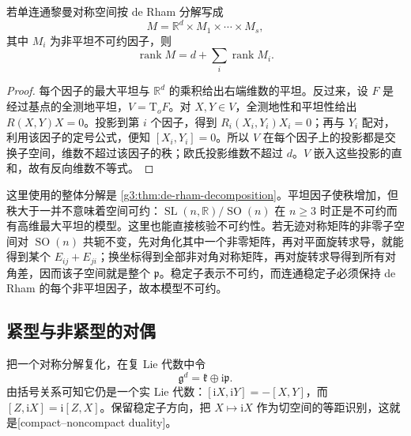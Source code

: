 \begin{proposition}\label{g3:prop:symmetric-rank-product}
	若单连通黎曼对称空间按 de Rham 分解写成
	\[
		M=\mathbb R^d\times M_1\times\cdots\times M_s,
	\]
	其中 \(M_i\) 为非平坦不可约因子，则
	\[
		\operatorname{rank}M=d+\sum_i\operatorname{rank}M_i.
	\]
\end{proposition}
\begin{proof}
	每个因子的最大平坦与 \(\mathbb R^d\) 的乘积给出右端维数的平坦。反过来，设 \(F\) 是经过基点的全测地平坦，\(V=\mathrm T_oF\)。对 \(X,Y\in V\)，全测地性和平坦性给出 \(R(X,Y)X=0\)。投影到第 \(i\) 个因子，得到 \(R_i(X_i,Y_i)X_i=0\)；再与 \(Y_i\) 配对，利用该因子的定号公式，便知 \([X_i,Y_i]=0\)。所以 \(V\) 在每个因子上的投影都是交换子空间，维数不超过该因子的秩；欧氏投影维数不超过 \(d\)。\(V\) 嵌入这些投影的直和，故有反向维数不等式。
\end{proof}

这里使用的整体分解是 \cref{g3:thm:de-rham-decomposition}。平坦因子使秩增加，但秩大于一并不意味着空间可约：\(\operatorname{SL}(n,\mathbb R)/\operatorname{SO}(n)\) 在 \(n\ge3\) 时正是不可约而有高维最大平坦的模型。这里也能直接核验不可约性。若无迹对称矩阵的非零子空间对 \(\operatorname{SO}(n)\) 共轭不变，先对角化其中一个非零矩阵，再对平面旋转求导，就能得到某个 \(E_{ij}+E_{ji}\)；换坐标得到全部非对角对称矩阵，再对旋转求导得到所有对角差，因而该子空间就是整个 \(\mathfrak p\)。稳定子表示不可约，而连通稳定子必须保持 de Rham 的每个非平坦因子，故本模型不可约。

\subsection{紧型与非紧型的对偶}
\label{g3:subsec:0504:07}

把一个对称分解复化，在复 Lie 代数中令
\begin{equation}\label{g3:eq:symmetric-dual-lie-algebra}
	\mathfrak g^d=\mathfrak k\oplus\mathrm i\mathfrak p.
\end{equation}
由括号关系可知它仍是一个实 Lie 代数：\([\mathrm iX,\mathrm iY]=-[X,Y]\)，而 \([Z,\mathrm iX]=\mathrm i[Z,X]\)。保留稳定子方向，把 \(X\mapsto\mathrm iX\) 作为切空间的等距识别，这就是[compact--noncompact duality]。

